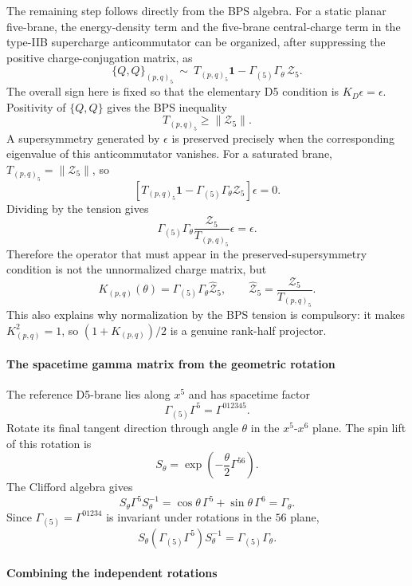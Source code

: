\documentclass[
  10pt,
  a4paper,
  openany]{book}
\begin{document}
The remaining step follows directly from the BPS algebra. For a static
planar five-brane, the energy-density term and the five-brane
central-charge term in the type-IIB supercharge anticommutator can be
organized, after suppressing the positive charge-conjugation matrix, as
\[
\{Q,Q\}_{(p,q)_5}
\ \sim\
T_{(p,q)_5}\mathbf1
-\Gamma_{(5)}\Gamma_\theta\,\mathcal Z_5.
\] The overall sign here is fixed so that the elementary D5 condition is
\(K_D\epsilon=\epsilon\). Positivity of \(\{Q,Q\}\) gives the BPS
inequality \[
T_{(p,q)_5}\geq \|\mathcal Z_5\|.
\] A supersymmetry generated by \(\epsilon\) is preserved precisely when
the corresponding eigenvalue of this anticommutator vanishes. For a
saturated brane, \(T_{(p,q)_5}=\|\mathcal Z_5\|\), so \[
\left[
T_{(p,q)_5}\mathbf1
-\Gamma_{(5)}\Gamma_\theta\mathcal Z_5
\right]\epsilon=0.
\] Dividing by the tension gives \[
\Gamma_{(5)}\Gamma_\theta
\frac{\mathcal Z_5}{T_{(p,q)_5}}\epsilon
=\epsilon.
\] Therefore the operator that must appear in the
preserved-supersymmetry condition is not the unnormalized charge matrix,
but \[
\boxed{
K_{(p,q)}(\theta)
=\Gamma_{(5)}\Gamma_\theta\widehat{\mathcal Z}_5
},
\qquad
\widehat{\mathcal Z}_5
=\frac{\mathcal Z_5}{T_{(p,q)_5}}.
\] This also explains why normalization by the BPS tension is
compulsory: it makes \(K_{(p,q)}^2=1\), so \((1+K_{(p,q)})/2\) is a
genuine rank-half projector.

\paragraph{The spacetime gamma matrix from the geometric
rotation}\label{the-spacetime-gamma-matrix-from-the-geometric-rotation}

The reference D5-brane lies along \(x^5\) and has spacetime factor \[
\Gamma_{(5)}\Gamma^5=\Gamma^{012345}.
\] Rotate its final tangent direction through angle \(\theta\) in the
\(x^5\)-\(x^6\) plane. The spin lift of this rotation is \[
S_\theta
=\exp\left(-\frac{\theta}{2}\Gamma^{56}\right).
\] The Clifford algebra gives \[
S_\theta\Gamma^5S_\theta^{-1}
=\cos\theta\,\Gamma^5+\sin\theta\,\Gamma^6
=\Gamma_\theta.
\] Since \(\Gamma_{(5)}=\Gamma^{01234}\) is invariant under rotations in
the \(56\) plane, \[
S_\theta
\left(\Gamma_{(5)}\Gamma^5\right)
S_\theta^{-1}
=\Gamma_{(5)}\Gamma_\theta.
\]

\paragraph{Combining the independent
rotations}\label{combining-the-independent-rotations}
\end{document}
